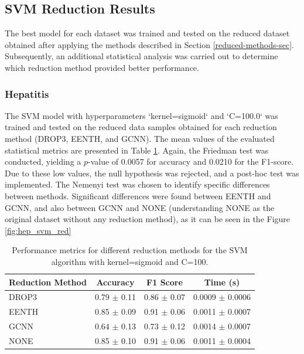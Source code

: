 \subsection{SVM Reduction Results}
The best model for each dataset was trained and tested on the reduced dataset obtained after applying the methods described in Section \ref{reduced-methods-sec}. Subsequently, an additional statistical analysis was carried out to determine which reduction method provided better performance.

\subsubsection{Hepatitis}
The SVM model with hyperparameters `kernel=sigmoid` and `C=100.0` was trained and tested on the reduced data samples obtained for each reduction method (DROP3, EENTH, and GCNN). The mean values of the evaluated statistical metrics are presented in Table \ref{tab:reduction_hep}. Again, the Friedman test was conducted, yielding a $p$-value of 0.0057 for accuracy and 0.0210 for the F1-score. Due to these low values, the null hypothesis was rejected, and a post-hoc test was implemented. The Nemenyi test was chosen to identify specific differences between methods. Significant differences were found between EENTH and GCNN, and also between GCNN and NONE (understanding NONE as the original dataset without any reduction method), as it can be seen in the Figure \ref{fig:hep_svm_red} 

\begin{table}[h!]
\centering
\begin{tabular}{|l|c|c|c|}
\hline
\textbf{Reduction Method} & \textbf{Accuracy} & \textbf{F1 Score} & \textbf{Time (s)} \\
\hline
DROP3 & 0.79 $\pm$ 0.11 & 0.86 $\pm$ 0.07 & 0.0009 $\pm$ 0.0006 \\
\hline
EENTH & 0.85 $\pm$ 0.09 & 0.91 $\pm$ 0.06 & 0.0011 $\pm$ 0.0007 \\
\hline
GCNN  & 0.64 $\pm$ 0.13 & 0.73 $\pm$ 0.12 & 0.0014 $\pm$ 0.0007 \\
\hline
NONE  & 0.85 $\pm$ 0.10 & 0.91 $\pm$ 0.06 & 0.0011 $\pm$ 0.0004 \\
\hline
\end{tabular}
\caption{Performance metrics for different reduction methods for the SVM algorithm with kernel=sigmoid and C=100.}
\label{tab:reduction_hep}
\end{table}

